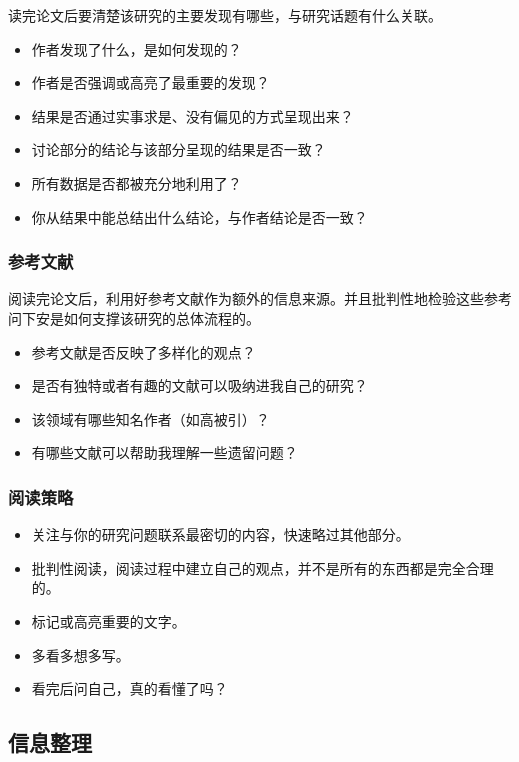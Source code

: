 \documentclass[cn,hazy,blue,14pt,screen]{elegantnote} %
\begin{document}
读完论文后要清楚该研究的主要发现有哪些，与研究话题有什么关联。

\begin{itemize}
  \item 作者发现了什么，是如何发现的？
  \item 作者是否强调或高亮了最重要的发现？
  \item 结果是否通过实事求是、没有偏见的方式呈现出来？
  \item 讨论部分的结论与该部分呈现的结果是否一致？
  \item 所有数据是否都被充分地利用了？
  \item 你从结果中能总结出什么结论，与作者结论是否一致？
\end{itemize}

\subsubsection{参考文献}

阅读完论文后，利用好参考文献作为额外的信息来源。并且批判性地检验这些参考问下安是如何支撑该研究的总体流程的。

\begin{itemize}
  \item 参考文献是否反映了多样化的观点？
  \item 是否有独特或者有趣的文献可以吸纳进我自己的研究？
  \item 该领域有哪些知名作者（如高被引）？
  \item 有哪些文献可以帮助我理解一些遗留问题？
\end{itemize}

\subsubsection{阅读策略}

\begin{itemize}
  \item 关注与你的研究问题联系最密切的内容，快速略过其他部分。
  \item 批判性阅读，阅读过程中建立自己的观点，并不是所有的东西都是完全合理的。
  \item 标记或高亮重要的文字。
  \item 多看多想多写。
  \item 看完后问自己，真的看懂了吗？
\end{itemize}

\subsection{信息整理}
\end{document}
